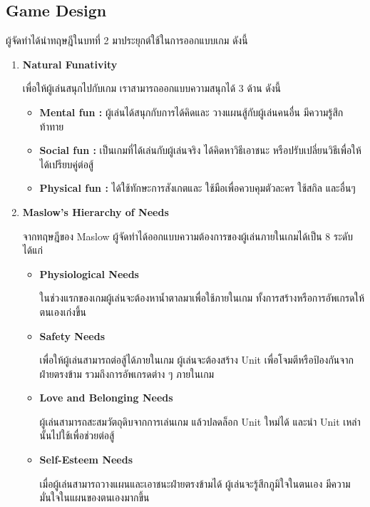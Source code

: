 \documentclass[12pt,oneside,openright,a4paper]{cpe-thai-project}
\begin{document}
\subsection{Game Design}

ผู้จัดทำได้นำทฤษฎีในบทที่ 2 มาประยุกต์ใช้ในการออกแบบเกม ดังนี้

\begin{enumerate}
  \item \textbf{Natural Funativity} 
  
  เพื่อให้ผู้เล่นสนุกไปกับเกม เราสามารถออกแบบความสนุกได้ 3 ด้าน ดังนี้
  
  \begin{itemize}
    \item \textbf{Mental fun :} ผู้เล่นได้สนุกกับการได้คิดและ
    วางแผนสู้กับผู้เล่นคนอื่น มีความรู้สึกท้าทาย
    \item \textbf{Social fun :} เป็นเกมที่ได้เล่นกับผู้เล่นจริง 
    ได้คิดหาวิธีเอาชนะ หรือปรับเปลี่ยนวิธีเพื่อให้ได้เปรียบคู่ต่อสู้
    \item \textbf{Physical fun :} ได้ใช้ทักษะการสังเกตและ
    ใช้มือเพื่อควบคุมตัวละคร ใช้สกิล และอื่นๆ
  \end{itemize}


  \item \textbf{Maslow’s Hierarchy of Needs}
  
  จากทฤษฎีของ Maslow ผู้จัดทำได้ออกแบบความต้องการของผู้เล่นภายในเกมได้เป็น 8 ระดับ ได้แก่

  \begin{itemize}
    \item \textbf{Physiological Needs} 
    
    ในช่วงแรกของเกมผู้เล่นจะต้องหาน้ำตาลมาเพื่อใช้ภายในเกม ทั้งการสร้างหรือการอัพเกรดให้ตนเองเก่งขึ้น

    \item \textbf{Safety Needs} 
    
    เพื่อให้ผู้เล่นสามารถต่อสู้ได้ภายในเกม ผู้เล่นจะต้องสร้าง Unit เพื่อโจมตีหรือป้องกันจากฝ่ายตรงข้าม รวมถึงการอัพเกรดต่าง ๆ ภายในเกม
    
    \item \textbf{Love and Belonging Needs} 
    
    ผู้เล่นสามารถสะสมวัตถุดิบจากการเล่นเกม แล้วปลดล็อก Unit ใหม่ได้ และนำ Unit เหล่านั้นไปใช้เพื่อช่วยต่อสู้
    
    \item \textbf{Self-Esteem Needs} 
    
    เมื่อผู้เล่นสามารถวางแผนและเอาชนะฝ่ายตรงข้ามได้ ผู้เล่นจะรู้สึกภูมิใจในตนเอง มีความมั่นใจในแผนของตนเองมากขึ้น
    

\end{itemize}
\end{enumerate}
\end{document}
